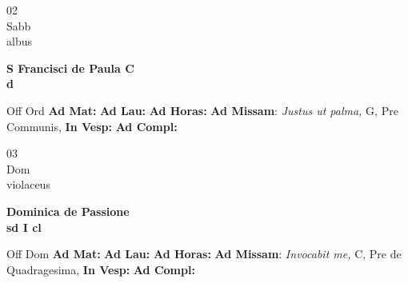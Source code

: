 \documentclass[10pt, openany]{book}
\begin{document}
        \begin{center}
            \begin{minipage}{3.5in}
                \vspace{2em}
                \begin{minipage}{0.5in}
                    {\Huge 02} \\
                    {\normalsize Sabb} \\
                    {\normalsize albus}
                \end{minipage}
                \begin{minipage}{3.0in}
                    \textbf{ \large S Francisci de Paula C \\
                    \textnormal{\normalsize d}} \\ 
                \end{minipage}
                \begin{justify}Off Ord
                    \textbf{Ad Mat: }
                    \textbf{Ad Lau: }
                    \textbf{Ad Horas: }\textbf{Ad Missam}: \textit{Justus ut palma,} G, Pre Communis,  
                    \textbf{In Vesp: }
                    \textbf{Ad Compl: }
                \end{justify}
            \end{minipage}
        \end{center}
    
        \begin{center}
            \begin{minipage}{3.5in}
                \vspace{2em}
                \begin{minipage}{0.5in}
                    {\Huge 03} \\
                    {\normalsize Dom} \\
                    {\normalsize violaceus}
                \end{minipage}
                \begin{minipage}{3.0in}
                    \textbf{ \large Dominica de Passione \\
                    \textnormal{\normalsize sd I cl}} \\ 
                \end{minipage}
                \begin{justify}Off Dom
                    \textbf{Ad Mat: }
                    \textbf{Ad Lau: }
                    \textbf{Ad Horas: }\textbf{Ad Missam}: \textit{Invocabit me,} C, Pre de Quadragesima,  
                    \textbf{In Vesp: }
                    \textbf{Ad Compl: }
                \end{justify}
            \end{minipage}
        \end{center}
    
\end{document}

